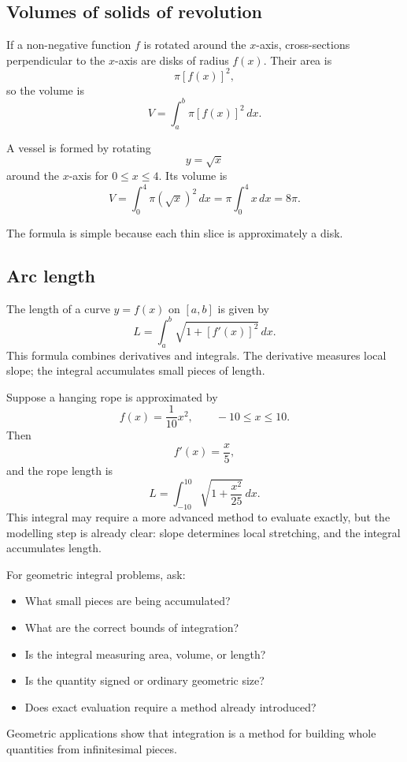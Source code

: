 \subsection*{Volumes of solids of revolution}

If a non-negative function \(f\) is rotated around the \(x\)-axis, cross-sections perpendicular to the \(x\)-axis are disks of radius \(f(x)\). Their area is
\[
\pi[f(x)]^2,
\]
so the volume is
\[
V=\int_a^b \pi[f(x)]^2\,dx.
\]

\begin{examplebox}
A vessel is formed by rotating
\[
y=\sqrt{x}
\]
around the \(x\)-axis for \(0\le x\le4\). Its volume is
\[
V=\int_0^4 \pi(\sqrt{x})^2\,dx
=\pi\int_0^4 x\,dx
=8\pi.
\]
\end{examplebox}

The formula is simple because each thin slice is approximately a disk.

\subsection*{Arc length}

The length of a curve \(y=f(x)\) on \([a,b]\) is given by
\[
L=\int_a^b\sqrt{1+[f'(x)]^2}\,dx.
\]
This formula combines derivatives and integrals. The derivative measures local slope; the integral accumulates small pieces of length.

\begin{examplebox}
Suppose a hanging rope is approximated by
\[
f(x)=\frac{1}{10}x^2,
\qquad -10\le x\le10.
\]
Then
\[
f'(x)=\frac{x}{5},
\]
and the rope length is
\[
L=\int_{-10}^{10}\sqrt{1+\frac{x^2}{25}}\,dx.
\]
This integral may require a more advanced method to evaluate exactly, but the modelling step is already clear: slope determines local stretching, and the integral accumulates length.
\end{examplebox}

\begin{summarybox}
For geometric integral problems, ask:
\begin{itemize}
\item What small pieces are being accumulated?
\item What are the correct bounds of integration?
\item Is the integral measuring area, volume, or length?
\item Is the quantity signed or ordinary geometric size?
\item Does exact evaluation require a method already introduced?
\end{itemize}
\end{summarybox}

Geometric applications show that integration is a method for building whole quantities from infinitesimal pieces.
